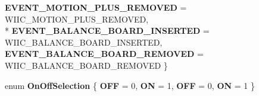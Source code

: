 \begin{DoxyCompactItemize}
{\bfseries E\-V\-E\-N\-T\-\_\-\-M\-O\-T\-I\-O\-N\-\_\-\-P\-L\-U\-S\-\_\-\-R\-E\-M\-O\-V\-E\-D} =  W\-I\-I\-C\-\_\-\-M\-O\-T\-I\-O\-N\-\_\-\-P\-L\-U\-S\-\_\-\-R\-E\-M\-O\-V\-E\-D, 
\\*
{\bfseries E\-V\-E\-N\-T\-\_\-\-B\-A\-L\-A\-N\-C\-E\-\_\-\-B\-O\-A\-R\-D\-\_\-\-I\-N\-S\-E\-R\-T\-E\-D} =  W\-I\-I\-C\-\_\-\-B\-A\-L\-A\-N\-C\-E\-\_\-\-B\-O\-A\-R\-D\-\_\-\-I\-N\-S\-E\-R\-T\-E\-D, 
{\bfseries E\-V\-E\-N\-T\-\_\-\-B\-A\-L\-A\-N\-C\-E\-\_\-\-B\-O\-A\-R\-D\-\_\-\-R\-E\-M\-O\-V\-E\-D} =  W\-I\-I\-C\-\_\-\-B\-A\-L\-A\-N\-C\-E\-\_\-\-B\-O\-A\-R\-D\-\_\-\-R\-E\-M\-O\-V\-E\-D
 \}
\item 
enum {\bfseries On\-Off\-Selection} \{ {\bfseries O\-F\-F} =  0, 
{\bfseries O\-N} =  1, 
{\bfseries O\-F\-F} =  0, 
{\bfseries O\-N} =  1
 \}
\end{DoxyCompactItemize}
